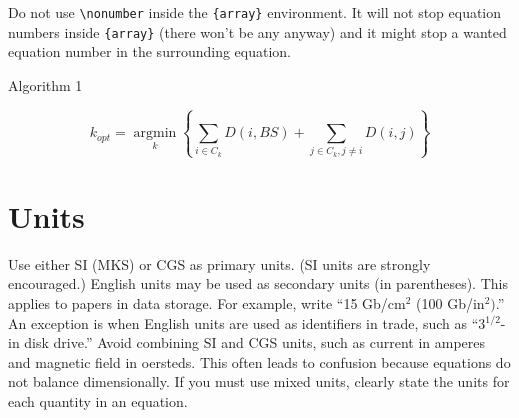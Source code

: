 \documentclass{ieeeaccess}
\begin{document}
Do not use \verb|\nonumber| inside the \verb|{array}| environment. It
will not stop equation numbers inside \verb|{array}| (there won't be
any anyway) and it might stop a wanted equation number in the
surrounding equation.

\begin{algorithm}[htp]

    \caption{Algorithm 1}\label{Alg-Decap}

    \begin{algorithmic}[1]
        \EndFor
        \[{k_{opt}} = \mathop {\arg \min }\limits_k \left\{ {\sum\limits_{i \in {C_k}} {D\left( {i,BS} \right)}  + \sum\limits_{j \in {C_k},j \ne i} {D\left( {i,j} \right)} } \right\}\]
    \end{algorithmic}

\end{algorithm}

\section{Units}
Use either SI (MKS) or CGS as primary units. (SI units are strongly
encouraged.) English units may be used as secondary units (in parentheses).
This applies to papers in data storage. For example, write ``15
Gb/cm$^{2}$ (100 Gb/in$^{2})$.'' An exception is when
English units are used as identifiers in trade, such as ``3$^{1\!/\!2}$-in
disk drive.'' Avoid combining SI and CGS units, such as current in amperes
and magnetic field in oersteds. This often leads to confusion because
equations do not balance dimensionally. If you must use mixed units, clearly
state the units for each quantity in an equation.
\end{document}

